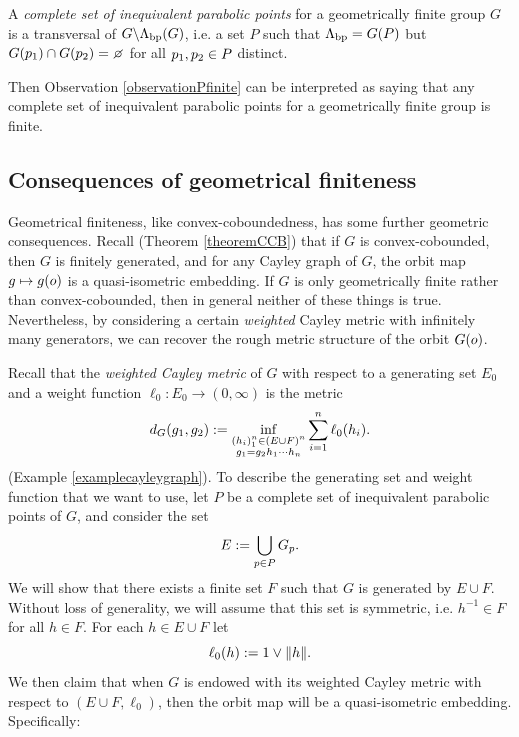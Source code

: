 \begin{definition}
\label{definitioncompleteset}
A \emph{complete set of inequivalent parabolic points} for a geometrically finite group $G$ is a transversal of $G\backslash\Lambda_{\mathrm{bp}}(G)$, i.e. a set $P$ such that $\Lambda_{\mathrm{bp}} = G(P)$ but $G(\bp_1)\cap G(\bp_2) = \emptyset$ for all $p_1,p_2\in P$ distinct.
\end{definition}

Then Observation \ref{observationPfinite} can be interpreted as saying that any complete set of inequivalent parabolic points for a geometrically finite group is finite.

\subsection{Consequences of geometrical finiteness}

Geometrical finiteness, like convex-coboundedness,  has some 
further geometric consequences. Recall (Theorem \ref{theoremCCB}) that if $G$ is convex-cobounded, then $G$ is finitely generated, and for any Cayley graph of $G$, the orbit map $g\mapsto g(o)$ is a quasi-isometric embedding. If $G$ is only geometrically finite rather than convex-cobounded, then in general neither of these things is true. Nevertheless, by considering a certain \emph{weighted} Cayley metric with infinitely many generators, we can recover the rough metric structure of the orbit $G(o)$.

Recall that the \emph{weighted Cayley metric} of $G$ with respect to a generating set $E_0$ and a weight function $\ell_0:E_0\to(0,\infty)$ is the metric
\[
d_G(g_1,g_2) := \inf_{\substack{(h_i)_1^n\in (E\cup F)^n \\ g_1 = g_2 h_1\cdots h_n}} \sum_{i = 1}^n \ell_0(h_i).
\]
(Example \ref{examplecayleygraph}). To describe the generating set and weight function that we want to use, let $P$ be a complete set of inequivalent parabolic points of $G$, and consider the set
\[
E := \bigcup_{p\in P} G_p.
\]
We will show that there exists a finite set $F$ such that $G$ is generated by $E\cup F$. Without loss of generality, we will assume that this set is symmetric, i.e. $h^{-1}\in F$ for all $h\in F$. For each $h\in E\cup F$ let
\begin{equation}
\label{l0def}
\ell_0(h) := 1\vee\|h\|.
\end{equation}
We then claim that when $G$ is endowed with its weighted Cayley metric with respect to $(E\cup F,\ell_0)$, then the orbit map will be a quasi-isometric embedding. Specifically:

